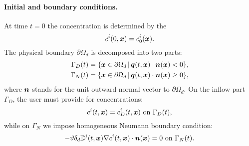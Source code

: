 


\paragraph{Initial and boundary conditions.}
At time $t=0$ the concentration is determined by the 
$$ c^i(0,\mathbf{\boldsymbol{x}}) = c^i_0(\mathbf{\boldsymbol{x}}). $$
The physical boundary $\partial\Omega_d$ is decomposed into two parts:
\begin{align*}
\Gamma_D(t) &= \{\mathbf{\boldsymbol{x}}\in \partial\Omega_d\,|\, \mathbf{\boldsymbol{q}}(t,\mathbf{\boldsymbol{x}})\cdot\mathbf{\boldsymbol{n}}(\mathbf{\boldsymbol{x}})<0\},\\
\Gamma_N(t) &= \{\mathbf{\boldsymbol{x}}\in \partial\Omega_d\,|\, \mathbf{\boldsymbol{q}}(t,\mathbf{\boldsymbol{x}})\cdot\mathbf{\boldsymbol{n}}(\mathbf{\boldsymbol{x}})\ge 0\},
\end{align*}
where $\mathbf{\boldsymbol{n}}$ stands for the unit outward normal vector to $\partial\Omega_d$.
On the inflow part $\Gamma_D$, the user must provide  for concentrations:
$$ c^i(t,\mathbf{\boldsymbol{x}}) = c^i_D(t,\mathbf{\boldsymbol{x}}) \mbox{ on }\Gamma_D(t), $$
while on $\Gamma_N$ we impose homogeneous Neumann boundary condition:
$$ -\vartheta\delta_d{{\mathbb{D}}}^i(t,\mathbf{\boldsymbol{x}})\nabla c^i(t,\mathbf{\boldsymbol{x}})\cdot\mathbf{\boldsymbol{n}}(\mathbf{\boldsymbol{x}}) = 0 \mbox{ on }\Gamma_N(t). $$






